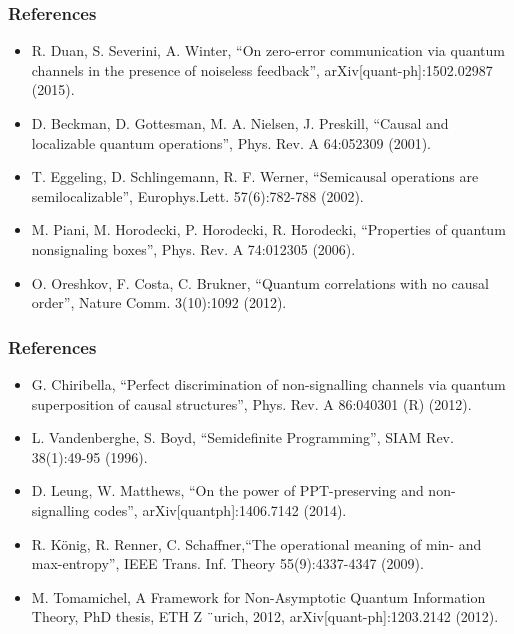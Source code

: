 \documentclass{beamer}
\begin{document}
\begin{frame}
\frametitle{References}

\begin{itemize}
\item R. Duan, S. Severini, A. Winter, “On zero-error communication via quantum channels in the presence
of noiseless feedback”, arXiv[quant-ph]:1502.02987 (2015).
\item D. Beckman, D. Gottesman, M. A. Nielsen, J. Preskill, “Causal and localizable quantum operations”,
Phys. Rev. A 64:052309 (2001).
\item T. Eggeling, D. Schlingemann, R. F. Werner, “Semicausal operations are semilocalizable”, Europhys.Lett. 57(6):782-788 (2002).

\item   M. Piani, M. Horodecki, P. Horodecki, R. Horodecki, “Properties of quantum nonsignaling boxes”,
Phys. Rev. A 74:012305 (2006).
\item O. Oreshkov, F. Costa, C. Brukner, “Quantum correlations with no causal order”, Nature Comm.
3(10):1092 (2012).

\end{itemize}
\end{frame}

\begin{frame}
\frametitle{References}

\begin{itemize}
\item G. Chiribella, “Perfect discrimination of non-signalling channels via quantum superposition of causal
structures”, Phys. Rev. A 86:040301 (R) (2012).
\item L. Vandenberghe, S. Boyd, “Semidefinite Programming”, SIAM Rev. 38(1):49-95 (1996).
\item D. Leung, W. Matthews, “On the power of PPT-preserving and non-signalling codes”, arXiv[quantph]:1406.7142 (2014).
\item R. K\"{o}nig, R. Renner, C. Schaffner,“The operational meaning of min- and max-entropy”, IEEE Trans.
Inf. Theory 55(9):4337-4347 (2009).

\item   M. Tomamichel, A Framework for Non-Asymptotic Quantum Information Theory, PhD thesis, ETH Z ¨urich,
2012, arXiv[quant-ph]:1203.2142 (2012).


\end{itemize}
\end{frame}
\end{document}

